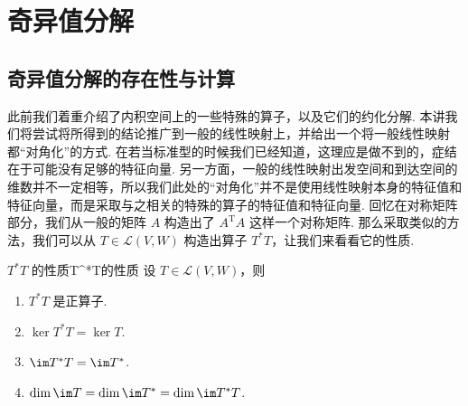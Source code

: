 \section{奇异值分解}

\subsection{奇异值分解的存在性与计算}

此前我们着重介绍了内积空间上的一些特殊的算子，以及它们的约化分解. 本讲我们将尝试将所得到的结论推广到一般的线性映射上，并给出一个将一般线性映射都``对角化''的方式. 在若当标准型的时候我们已经知道，这理应是做不到的，症结在于可能没有足够的特征向量. 另一方面，一般的线性映射出发空间和到达空间的维数并不一定相等，所以我们此处的``对角化''并不是使用线性映射本身的特征值和特征向量，而是采取与之相关的特殊的算子的特征值和特征向量. 回忆在对称矩阵部分，我们从一般的矩阵 $A$ 构造出了 $A^{\mathrm{T}}A$ 这样一个对称矩阵. 那么采取类似的方法，我们可以从 $T \in \mathcal{L}(V, W)$ 构造出算子 $T^*T$，让我们来看看它的性质.

\begin{theorem}{$T^*T$ 的性质}{T^*T的性质}
    设 $T \in \mathcal{L}(V, W)$，则
    \begin{enumerate}
        \item $T^*T$ 是正算子.

        \item $\ker T^*T = \ker T$.

        \item $\im T^*T = \im T^*$.

        \item $\dim \im T = \dim \im T^* = \dim \im T^*T$.
    \end{enumerate}
\end{theorem}

